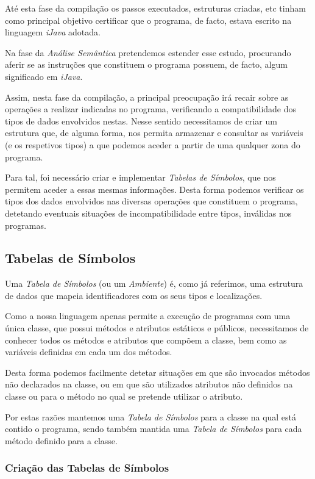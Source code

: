 \documentclass[11pt,a4paper]{article}
\begin{document}
	Até esta fase da compilação os passos executados, estruturas criadas, etc tinham como principal objetivo certificar que o programa, de facto, estava escrito na linguagem \emph{iJava} adotada.
	
	Na fase da \emph{Análise Semântica} pretendemos estender esse estudo, procurando aferir se as instruções que constituem o programa possuem, de facto, algum significado em \emph{iJava}.
	
	Assim, nesta fase da compilação, a principal preocupação irá recair sobre as operações a realizar indicadas no programa, verificando a compatibilidade dos tipos de dados envolvidos nestas. Nesse sentido necessitamos de criar um estrutura que, de alguma forma, nos permita armazenar e consultar as variáveis (e os respetivos tipos) a que podemos aceder a partir de uma qualquer zona do programa.
	
	Para tal, foi necessário criar e implementar \emph{Tabelas de Símbolos}, que nos permitem aceder a essas mesmas informações. Desta forma podemos verificar os tipos dos dados envolvidos nas diversas operações que constituem o programa, detetando eventuais situações de incompatibilidade entre tipos, inválidas nos programas.

	\subsection{Tabelas de Símbolos}
	
	Uma \emph{Tabela de Símbolos} (ou um \emph{Ambiente}) é, como já referimos, uma estrutura de dados que mapeia identificadores com os seus tipos e localizações.
	
	Como a nossa linguagem apenas permite a execução de programas com uma única classe, que possui métodos e atributos estáticos e públicos, necessitamos de conhecer todos os métodos e atributos que compõem a classe, bem como as variáveis definidas em cada um dos métodos.
	
	Desta forma podemos facilmente detetar situações em que são invocados métodos não declarados na classe, ou em que são utilizados atributos não definidos na classe ou para o método no qual se pretende utilizar o atributo. 

	Por estas razões mantemos uma \emph{Tabela de Símbolos} para a classe na qual está contido o programa, sendo também mantida uma \emph{Tabela de Símbolos} para cada método definido para a classe.
	
	\subsubsection{Criação das Tabelas de Símbolos}
	
\end{document}
